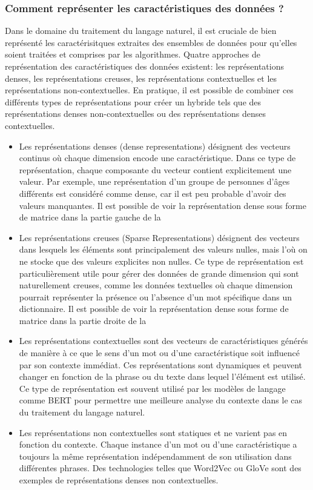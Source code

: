 \documentclass{rapport}
\begin{document}
\subsubsection{Comment représenter les caractéristiques des données ?}
Dans le domaine du traitement du langage naturel, il est cruciale de bien représenté les caractérisitques extraites des ensembles de données pour qu'elles soient traitées et comprises par les algorithmes. Quatre approches de représentation des caractéristiques des données existent: les représentations denses, les représentations creuses, les représentations contextuelles et les représentations non-contextuelles. En pratique, il est possible de combiner ces différents types de représentations pour créer un hybride tels que des représentations denses non-contextuelles ou des représentations denses contextuelles.   
\begin{itemize}
    \item Les représentations denses (dense representations) désignent des vecteurs continus où chaque dimension encode une caractéristique. Dans ce type de représentation, chaque composante du vecteur contient explicitement une valeur. Par exemple, une représentation d'un groupe de personnes d'âges différents est considéré comme dense, car il est peu probable d'avoir des valeurs manquantes. Il est possible de voir la représentation dense sous forme de matrice dans la partie gauche de la 
    \item Les représentations creuses (Sparse Representations) désignent des vecteurs dans lesquels les éléments sont principalement des valeurs nulles, mais l'où on ne stocke que des valeurs explicites non nulles. Ce type de représentation est particulièrement utile pour gérer des données de grande dimension qui sont naturellement creuses, comme les données textuelles où chaque dimension pourrait représenter la présence ou l'absence d'un mot spécifique dans un dictionnaire. Il est possible de voir la représentation dense sous forme de matrice dans la partie droite de la 
    \item Les représentations contextuelles sont des vecteurs de caractéristiques générés de manière à ce que le sens d’un mot ou d’une caractéristique soit influencé par son contexte immédiat. Ces représentations sont dynamiques et peuvent changer en fonction de la phrase ou du texte dans lequel l'élément est utilisé. Ce type de représentation est souvent utilisé par les modèles de langage comme BERT pour permettre une meilleure analyse du contexte dans le cas du traitement du langage naturel.
    \item Les représentations non contextuelles sont statiques et ne varient pas en fonction du contexte. Chaque instance d'un mot ou d'une caractéristique a toujours la même représentation indépendamment de son utilisation dans différentes phrases. Des technologies telles que Word2Vec ou GloVe sont des exemples de représentations denses non contextuelles.
\end{itemize}
\end{document}
